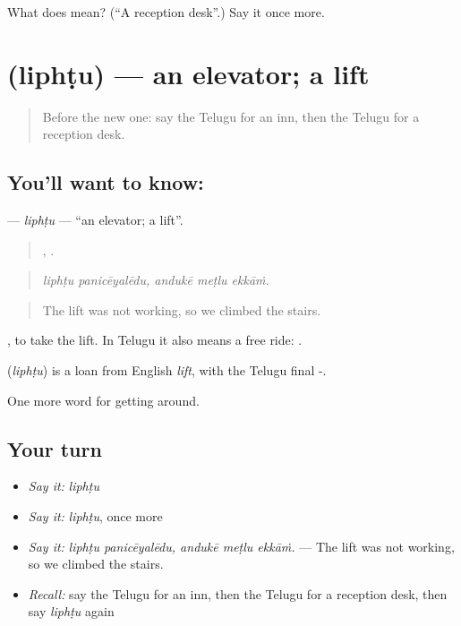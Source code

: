 \begin{tcolorbox}[breakable,colback=teal!4,colframe=teal!35!black,title={Before you move on}]
What does  mean? (\textquotedblleft{}A reception desk\textquotedblright{}.) Say it once more.
\end{tcolorbox}
\section[\texorpdfstring{\te{లిఫ్టు} (liphṭu)}{లిఫ్టు (liphṭu)}]{ (liphṭu) — an elevator; a lift}

\label{lesson:TE-C457-liphtu}



\begin{quote}
Before the new one: say the Telugu for an inn, then the Telugu for a reception desk.
\end{quote}

\subsection*{You'll want to know: }
\textbf{} — \emph{liphṭu} — \textquotedblleft{}an elevator; a lift\textquotedblright{}.

\begin{quote}
 ,   .
\end{quote}

\begin{quote}
\emph{liphṭu panicēyalēdu, andukē meṭlu ekkāṁ.}
\end{quote}

\begin{quote}
The lift was not working, so we climbed the stairs.
\end{quote}

 , to take the lift. In Telugu it also means a free ride:  .

\begin{cousinweb}
\textbf{} (\emph{liphṭu}) is a loan from English \emph{lift}, with the Telugu final -.
\end{cousinweb}

\begin{grammarlens}[title={What you've built}]
One more word for getting around.
\end{grammarlens}

\subsection*{Your turn}
\begin{itemize}
\raggedright
  \item \emph{Say it:} \emph{liphṭu}
  \item \emph{Say it:} \emph{liphṭu}, once more
  \item \emph{Say it:} \emph{liphṭu panicēyalēdu, andukē meṭlu ekkāṁ.} — The lift was not working, so we climbed the stairs.
  \item \emph{Recall:} say the Telugu for an inn, then the Telugu for a reception desk, then say \emph{liphṭu} again
\end{itemize}

